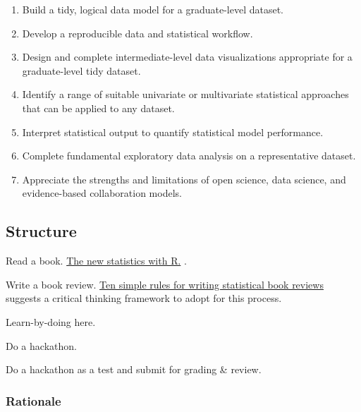 \documentclass[
]{book}
\providecommand{\tightlist}{%
  \setlength{\itemsep}{0pt}\setlength{\parskip}{0pt}}
\begin{document}
\begin{enumerate}
\def\labelenumi{\arabic{enumi}.}
\tightlist
\item
  Build a tidy, logical data model for a graduate-level dataset.\\
\item
  Develop a reproducible data and statistical workflow.\\
\item
  Design and complete intermediate-level data visualizations appropriate for a graduate-level tidy dataset.\\
\item
  Identify a range of suitable univariate or multivariate statistical approaches that can be applied to any dataset.\\
\item
  Interpret statistical output to quantify statistical model performance.\\
\item
  Complete fundamental exploratory data analysis on a representative dataset.\\
\item
  Appreciate the strengths and limitations of open science, data science, and evidence-based collaboration models.
\end{enumerate}

\hypertarget{structure}{%
\subsection*{Structure}\label{structure}}

Read a book. \href{https://global.oup.com/academic/product/the-new-statistics-with-r-9780198798187?cc=us\&lang=en\&}{The new statistics with R.} \citep{RN7358}.

Write a book review. \href{https://journals.plos.org/ploscompbiol/article?id=10.1371/journal.pcbi.1006562}{Ten simple rules for writing statistical book reviews} \citep{RN6148} suggests a critical thinking framework to adopt for this process.

Learn-by-doing here.

Do a hackathon.

Do a hackathon as a test and submit for grading \& review.

\hypertarget{rationale}{%
\subsubsection*{Rationale}\label{rationale}}
\end{document}
